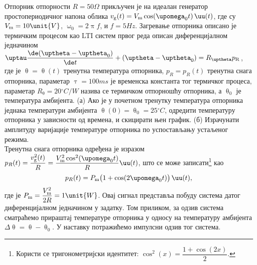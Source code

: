 \mnDifficult\PID
Отпорник отпорности $R = 50\unit{\Omega}$ прикључен је на идеалан генератор простопериодичног напона облика 
$v_{\rm g}(t) = V_{\rm m} \cos(\upomega_0 t)\,\uu(t)$, где су $V_{\rm m} = 10\unit{V}$, 
$\upomega_0 = 2\uppi f$, и $f = 5\unit{Hz}$. Загревање отпорника описано је термичким 
процесом као LTI систем првог реда описан диференцијалном једначином 
$\uptau \dfrac{\de (\uptheta-\uptheta_0)}{\de t} + (\uptheta-\uptheta_0) = R_{\uptheta} p_{\rm R}$, где је 
$\uptheta = \uptheta(t)$ тренутна температура отпорника, 
$p_R = p_R(t)$ тренутна снага отпорника, параметар
$\uptau = 100\unit{ms}$ је временска константа тог термичког процеса,
 параметар $R_{\uptheta} = 20\unit{^\circ C/W}$ назива се термичком отпорношћу 
отпорника, а $\uptheta_0$ је температура амбијента. 
(а) Ако је у почетном тренутку температура отпорника једнака температури амбијента $\uptheta(0) = \uptheta_0 = 25\unit{^\circ C}$,
одредити температуру отпорника у зависности од времена, и скицирати њен график. 
(б) Израчунати амплитуду варијације температуре отпорника по успостављању 
устаљеног режима. 
\\[2mm]

\textsc{}
Тренутна снага отпорника одређена је изразом 
$p_{R}(t) = \dfrac{v_{\rm g}^2(t)}{R} = \dfrac{V_{\rm m}^2 \cos^2(\upomega_0 t)}{R} \uu(t)$, што се може 
записати\footnote{
    Користи се тригонометријски идентитет: $\cos^2(x) = \dfrac{1 + \cos(2x)}{2}$.
}
као 
\begin{equation}
    p_{R}(t) = P_{\rm m} \bigl(1 + \cos(2\upomega_0 t) \bigr) \, \uu(t), \label{eq:\ID.1}
\end{equation} 
где је 
$P_{\rm m} = \dfrac{V_{\rm m}^2}{2R} = 1\unit{W}$. Овај сигнал представља побуду система датог диференцијалном
једначином у задатку. Том приликом, за одзив система сматраћемо прираштај температуре отпорника у односу 
на температуру амбијента $\Delta\uptheta = \uptheta - \uptheta_0$. У наставку потражићемо импулсни одзив тог система. 

